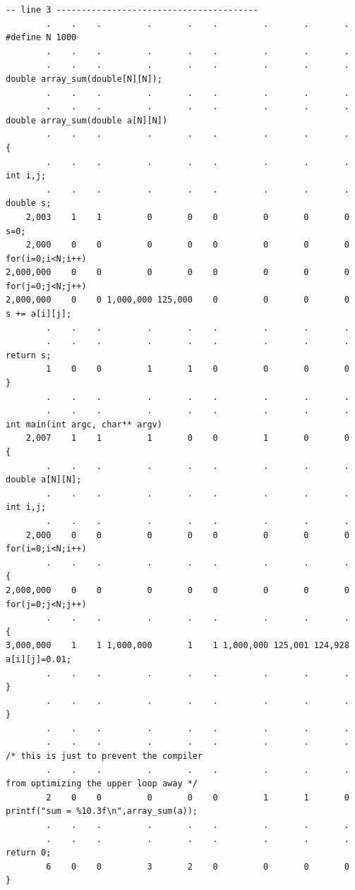 \begin{verbatim}
-- line 3 ----------------------------------------
        .    .    .         .       .    .         .       .       .  #define N 1000
        .    .    .         .       .    .         .       .       .
        .    .    .         .       .    .         .       .       .  double array_sum(double[N][N]);
        .    .    .         .       .    .         .       .       .
        .    .    .         .       .    .         .       .       .  double array_sum(double a[N][N])
        .    .    .         .       .    .         .       .       .  {
        .    .    .         .       .    .         .       .       .    int i,j;
        .    .    .         .       .    .         .       .       .    double s;
    2,003    1    1         0       0    0         0       0       0    s=0;
    2,000    0    0         0       0    0         0       0       0    for(i=0;i<N;i++)
2,000,000    0    0         0       0    0         0       0       0      for(j=0;j<N;j++)
2,000,000    0    0 1,000,000 125,000    0         0       0       0        s += a[i][j];
        .    .    .         .       .    .         .       .       .
        .    .    .         .       .    .         .       .       .    return s;
        1    0    0         1       1    0         0       0       0  }
        .    .    .         .       .    .         .       .       .
        .    .    .         .       .    .         .       .       .  int main(int argc, char** argv)
    2,007    1    1         1       0    0         1       0       0  {
        .    .    .         .       .    .         .       .       .    double a[N][N];
        .    .    .         .       .    .         .       .       .    int i,j;
        .    .    .         .       .    .         .       .       .
    2,000    0    0         0       0    0         0       0       0    for(i=0;i<N;i++)
        .    .    .         .       .    .         .       .       .    {
2,000,000    0    0         0       0    0         0       0       0      for(j=0;j<N;j++)
        .    .    .         .       .    .         .       .       .      {
3,000,000    1    1 1,000,000       1    1 1,000,000 125,001 124,928        a[i][j]=0.01;
        .    .    .         .       .    .         .       .       .      }
        .    .    .         .       .    .         .       .       .    }
        .    .    .         .       .    .         .       .       .
        .    .    .         .       .    .         .       .       .    /* this is just to prevent the compiler
        .    .    .         .       .    .         .       .       .       from optimizing the upper loop away */
        2    0    0         0       0    0         1       1       0    printf("sum = %10.3f\n",array_sum(a));
        .    .    .         .       .    .         .       .       .
        .    .    .         .       .    .         .       .       .    return 0;
        6    0    0         3       2    0         0       0       0  }


\end{verbatim}
